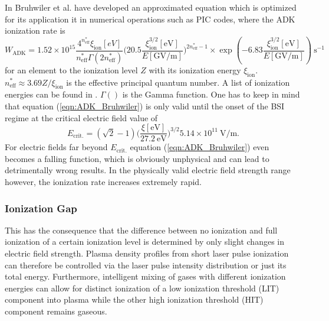 In \cite{bruhwiler2003PoP} Bruhwiler et al. have developed an approximated equation which is optimized for its application it in numerical operations such as PIC codes, where the ADK ionization rate is 
\begin{equation}
W_\mathrm{ADK}=1.52\times 10^{15}\frac{4^{n^*_\mathrm{eff}}\xi_\mathrm{ion}[eV]}{n^*_\mathrm{eff}\Gamma(2n^*_\mathrm{eff})}\Big(20.5\frac{\xi_\mathrm{ion}^{3/2}[\mathrm{eV}]}{E[\mathrm{GV/m}]}\Big)^{2n^*_\mathrm{eff}-1}\times \exp(-6.83\frac{\xi_\mathrm{ion}^{3/2}[\mathrm{eV}]}{E[\mathrm{GV/m}]})\ \mathrm{s}^{-1}
\label{eqn:ADK_Bruhwiler}
\end{equation}
for an element to the ionization level $Z$ with its ionization energy $\xi_\mathrm{ion}$.
$n^*_\mathrm{eff}\approx 3.69Z/\xi_\mathrm{ion}$ is the effective principal quantum number.
A list of ionization energies can be found in \cite{Kelly_1982_Ion_Energies}. $\Gamma()$ is the Gamma function. 
One has to keep in mind that equation (\ref{eqn:ADK_Bruhwiler}) is only valid until the onset of the BSI regime at the critical electric field value of 
\begin{equation}
E_\mathrm{crit.}=(\sqrt{2}-1)\Big(\frac{\xi [\mathrm{eV}]}{27.2\ \mathrm{eV}}\Big)^{3/2} 5.14\times 10^{11}\ \mathrm{V/m}.
\end{equation}
For electric fields far beyond $E_\mathrm{crit.}$ equation (\ref{eqn:ADK_Bruhwiler}) even becomes a falling function, which is obviously unphysical and can lead to detrimentally wrong results.
In the physically valid electric field strength range however, the ionization rate increases extremely rapid. 
\subsubsection*{Ionization Gap}
This has the consequence that the difference between no ionization and full ionization of a certain ionization level is determined by only slight changes in electric field strength. Plasma density profiles from short laser pulse ionization can therefore be controlled via the laser pulse intensity distribution or just its total energy. 
Furthermore, intelligent mixing of gases with different ionization energies can allow for distinct ionization of a low ionization threshold (LIT) component into plasma while the other high ionization threshold (HIT) component remains gaseous.

